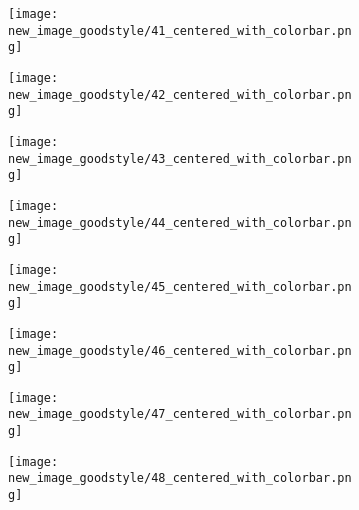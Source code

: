 \documentclass[a4paper,12pt]{article}
\begin{document}
\begin{figure}[H]
  \begin{subfigure}{0.11\textwidth}
    \texttt{[image: new\_image\_goodstyle/41\_centered\_with\_colorbar.png]}
  \end{subfigure}
  \hfill
  \begin{subfigure}{0.11\textwidth}
    \texttt{[image: new\_image\_goodstyle/42\_centered\_with\_colorbar.png]}
  \end{subfigure}
  \hfill
  \begin{subfigure}{0.11\textwidth}
    \texttt{[image: new\_image\_goodstyle/43\_centered\_with\_colorbar.png]}
  \end{subfigure}
  \hfill
  \begin{subfigure}{0.11\textwidth}
    \texttt{[image: new\_image\_goodstyle/44\_centered\_with\_colorbar.png]}
  \end{subfigure}
  \hfill
  \begin{subfigure}{0.11\textwidth}
    \texttt{[image: new\_image\_goodstyle/45\_centered\_with\_colorbar.png]}
  \end{subfigure}
  \hfill
  \begin{subfigure}{0.11\textwidth}
    \texttt{[image: new\_image\_goodstyle/46\_centered\_with\_colorbar.png]}
  \end{subfigure}
  \hfill
  \begin{subfigure}{0.11\textwidth}
    \texttt{[image: new\_image\_goodstyle/47\_centered\_with\_colorbar.png]}
  \end{subfigure}
  \hfill
  \begin{subfigure}{0.11\textwidth}
    \texttt{[image: new\_image\_goodstyle/48\_centered\_with\_colorbar.png]}
  \end{subfigure}
  \hfill
\end{figure}
\end{document}
